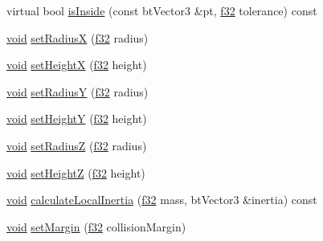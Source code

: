 \begin{DoxyCompactItemize}
\item 
virtual bool \mbox{\hyperlink{classnjli_1_1_physics_shape_capsule_a68c39b5cf57194cff15a904d3a944e3c}{is\+Inside}} (const bt\+Vector3 \&pt, \mbox{\hyperlink{_util_8h_a5f6906312a689f27d70e9d086649d3fd}{f32}} tolerance) const
\item 
\mbox{\hyperlink{_thread_8h_af1e856da2e658414cb2456cb6f7ebc66}{void}} \mbox{\hyperlink{classnjli_1_1_physics_shape_capsule_a17194d0ea8151feb0b6faf0b39842bdb}{set\+RadiusX}} (\mbox{\hyperlink{_util_8h_a5f6906312a689f27d70e9d086649d3fd}{f32}} radius)
\item 
\mbox{\hyperlink{_thread_8h_af1e856da2e658414cb2456cb6f7ebc66}{void}} \mbox{\hyperlink{classnjli_1_1_physics_shape_capsule_a1983fb785ef1314f92027dd209d96774}{set\+HeightX}} (\mbox{\hyperlink{_util_8h_a5f6906312a689f27d70e9d086649d3fd}{f32}} height)
\item 
\mbox{\hyperlink{_thread_8h_af1e856da2e658414cb2456cb6f7ebc66}{void}} \mbox{\hyperlink{classnjli_1_1_physics_shape_capsule_a5799e459af37db7465c58103738070a4}{set\+RadiusY}} (\mbox{\hyperlink{_util_8h_a5f6906312a689f27d70e9d086649d3fd}{f32}} radius)
\item 
\mbox{\hyperlink{_thread_8h_af1e856da2e658414cb2456cb6f7ebc66}{void}} \mbox{\hyperlink{classnjli_1_1_physics_shape_capsule_a3352f7dee2c3f947f8f71ad1c4d9b46e}{set\+HeightY}} (\mbox{\hyperlink{_util_8h_a5f6906312a689f27d70e9d086649d3fd}{f32}} height)
\item 
\mbox{\hyperlink{_thread_8h_af1e856da2e658414cb2456cb6f7ebc66}{void}} \mbox{\hyperlink{classnjli_1_1_physics_shape_capsule_a93ecc81a4a9f71c82e6968b10d7decf8}{set\+RadiusZ}} (\mbox{\hyperlink{_util_8h_a5f6906312a689f27d70e9d086649d3fd}{f32}} radius)
\item 
\mbox{\hyperlink{_thread_8h_af1e856da2e658414cb2456cb6f7ebc66}{void}} \mbox{\hyperlink{classnjli_1_1_physics_shape_capsule_a076f5e3be196237e9854d9ae2ceadfe5}{set\+HeightZ}} (\mbox{\hyperlink{_util_8h_a5f6906312a689f27d70e9d086649d3fd}{f32}} height)
\item 
\mbox{\hyperlink{_thread_8h_af1e856da2e658414cb2456cb6f7ebc66}{void}} \mbox{\hyperlink{classnjli_1_1_physics_shape_capsule_a3d69704b5ac77d6fd4578a9aba53e422}{calculate\+Local\+Inertia}} (\mbox{\hyperlink{_util_8h_a5f6906312a689f27d70e9d086649d3fd}{f32}} mass, bt\+Vector3 \&inertia) const
\item 
\mbox{\hyperlink{_thread_8h_af1e856da2e658414cb2456cb6f7ebc66}{void}} \mbox{\hyperlink{classnjli_1_1_physics_shape_capsule_a376aed4ab15cbc18e30b4ebd65c6f864}{set\+Margin}} (\mbox{\hyperlink{_util_8h_a5f6906312a689f27d70e9d086649d3fd}{f32}} collision\+Margin)

\end{DoxyCompactItemize}

